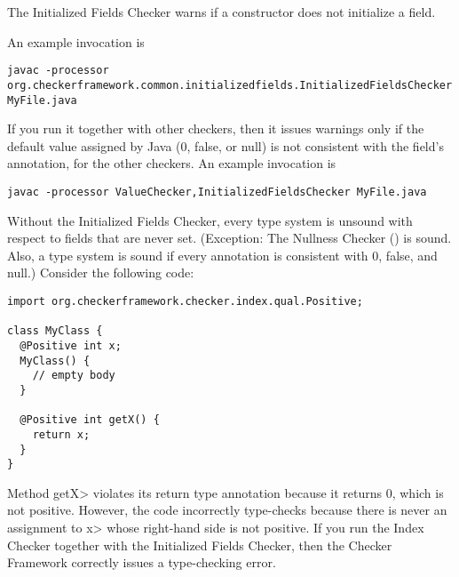 \htmlhr
{}

The Initialized Fields Checker warns if a constructor does not initialize a
field.



An example invocation is

\begin{Verbatim}
javac -processor org.checkerframework.common.initializedfields.InitializedFieldsChecker MyFile.java
\end{Verbatim}

If you run it together with other checkers, then it issues warnings only if
the default value assigned by Java (0, false, or null) is not consistent
with the field's annotation, for the other checkers.
An example invocation is

\begin{Verbatim}
javac -processor ValueChecker,InitializedFieldsChecker MyFile.java
\end{Verbatim}



Without the Initialized Fields Checker, every type system is
unsound with respect to fields that are never set.  (Exception:  The
Nullness Checker () is sound. Also, a type
system is sound if every annotation is consistent with 0, false, and null.)
Consider the following code:

\begin{Verbatim}
import org.checkerframework.checker.index.qual.Positive;

class MyClass {
  @Positive int x;
  MyClass() {
    // empty body
  }

  @Positive int getX() {
    return x;
  }
}
\end{Verbatim}

\noindent
Method \<getX> violates its return type annotation because it returns 0, which is not positive.
However, the code incorrectly type-checks because there is never an assignment to \<x>
whose right-hand side is not positive.
If you run the Index Checker together with the Initialized Fields Checker,
then the Checker Framework correctly issues a type-checking error.


